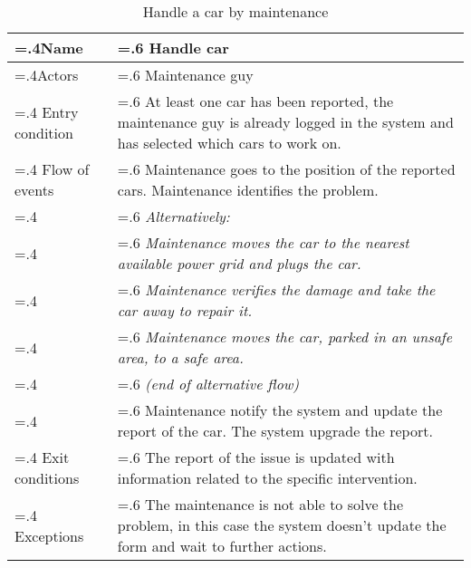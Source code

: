 \documentclass[10pt, a4paper,titlepage]{article}
\begin{document}
\begin{table}[h]
\caption{Handle a car by maintenance} \label{tab:scenario12}
\begin{tabularx}{\textwidth}{|>{\hsize=.4\hsize}X|>{\hsize=.6\hsize}X|}
\hline
Name & Handle car\\
\hline
Actors & Maintenance guy\\ 
\hline
Entry condition & At least one car has been reported, the maintenance guy is already logged in the system and has selected which cars to work on.\\
\hline
Flow of events & Maintenance goes to the position of the reported cars. Maintenance identifies the problem.\\
& \textit{Alternatively:}\\
& \textit{Maintenance moves the car to the nearest available power grid and plugs the car.}\\
& \textit{Maintenance verifies the damage and take the car away to repair it.}\\
& \textit{Maintenance moves the car, parked in an unsafe area, to a safe area.}\\
& \textit{(end of alternative flow)}\\
& Maintenance notify the system and update the report of the car. The system upgrade the report.\\
\hline
Exit conditions & The report of the issue is updated with information related to the specific intervention.\\
\hline
Exceptions & The maintenance is not able to solve the problem, in this case the system doesn’t update the form and wait to further actions.\\
\hline
\end{tabularx}
\end{table}
\end{document}
